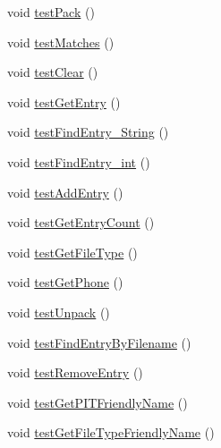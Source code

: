 \begin{DoxyCompactItemize}
\item 
void \hyperlink{class_c_a_s_u_a_l_1_1archiving_1_1libpit_1_1_pit_data_test_a3ec5b1627a2658066dadc16787c8aa6f}{test\-Pack} ()
\item 
void \hyperlink{class_c_a_s_u_a_l_1_1archiving_1_1libpit_1_1_pit_data_test_a6460f6baf4f86fd725c678302320ef18}{test\-Matches} ()
\item 
void \hyperlink{class_c_a_s_u_a_l_1_1archiving_1_1libpit_1_1_pit_data_test_a997343d35441bfba1b38d1673a494f45}{test\-Clear} ()
\item 
void \hyperlink{class_c_a_s_u_a_l_1_1archiving_1_1libpit_1_1_pit_data_test_af8119beb473ef4e775a7150e4f265b06}{test\-Get\-Entry} ()
\item 
void \hyperlink{class_c_a_s_u_a_l_1_1archiving_1_1libpit_1_1_pit_data_test_ab5e9db906804c24bdce972af363ac721}{test\-Find\-Entry\-\_\-\-String} ()
\item 
void \hyperlink{class_c_a_s_u_a_l_1_1archiving_1_1libpit_1_1_pit_data_test_a0399e5a62e86513cad2b34004ad8082b}{test\-Find\-Entry\-\_\-int} ()
\item 
void \hyperlink{class_c_a_s_u_a_l_1_1archiving_1_1libpit_1_1_pit_data_test_a649f113767782fbb9c7f8dca8a771c4c}{test\-Add\-Entry} ()
\item 
void \hyperlink{class_c_a_s_u_a_l_1_1archiving_1_1libpit_1_1_pit_data_test_a08e72557128fecc1f2ff30d1ea949e3d}{test\-Get\-Entry\-Count} ()
\item 
void \hyperlink{class_c_a_s_u_a_l_1_1archiving_1_1libpit_1_1_pit_data_test_afcfc45a7f7be1183df1d73fc2f14fb9c}{test\-Get\-File\-Type} ()
\item 
void \hyperlink{class_c_a_s_u_a_l_1_1archiving_1_1libpit_1_1_pit_data_test_a65121aeb3055b6821d4f27a90a3cecab}{test\-Get\-Phone} ()
\item 
void \hyperlink{class_c_a_s_u_a_l_1_1archiving_1_1libpit_1_1_pit_data_test_a6208bd9830ef1948147d5b996a933d8d}{test\-Unpack} ()
\item 
void \hyperlink{class_c_a_s_u_a_l_1_1archiving_1_1libpit_1_1_pit_data_test_acc0c22d48286e25e684877e41fe31c79}{test\-Find\-Entry\-By\-Filename} ()
\item 
void \hyperlink{class_c_a_s_u_a_l_1_1archiving_1_1libpit_1_1_pit_data_test_a4b423614f54a172760818ff7862955ea}{test\-Remove\-Entry} ()
\item 
void \hyperlink{class_c_a_s_u_a_l_1_1archiving_1_1libpit_1_1_pit_data_test_a3774a97243537fccc66526f555f95ca5}{test\-Get\-P\-I\-T\-Friendly\-Name} ()
\item 
void \hyperlink{class_c_a_s_u_a_l_1_1archiving_1_1libpit_1_1_pit_data_test_a25606b857bee21794e8c1572a0d4ee0b}{test\-Get\-File\-Type\-Friendly\-Name} ()

\end{DoxyCompactItemize}

